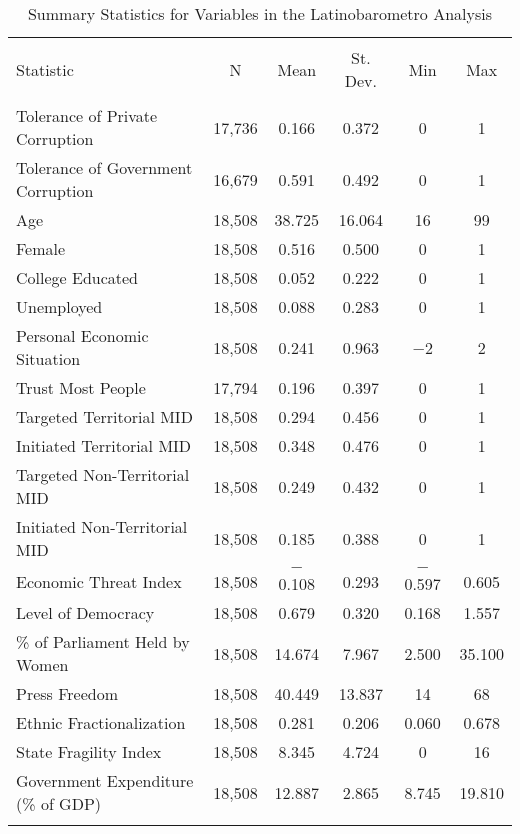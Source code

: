 \documentclass[11pt,]{article}
\begin{document}
\begin{table}[!htbp] \centering 
  \caption{Summary Statistics for Variables in the Latinobarometro Analysis} 
  \label{tab:summarylb} 
\begin{tabular}{@{\extracolsep{5pt}}lccccc} 
\\[-1.8ex]\hline 
\hline \\[-1.8ex] 
Statistic & \multicolumn{1}{c}{N} & \multicolumn{1}{c}{Mean} & \multicolumn{1}{c}{St. Dev.} & \multicolumn{1}{c}{Min} & \multicolumn{1}{c}{Max} \\ 
\hline \\[-1.8ex] 
Tolerance of Private Corruption & 17,736 & 0.166 & 0.372 & 0 & 1 \\ 
Tolerance of Government Corruption & 16,679 & 0.591 & 0.492 & 0 & 1 \\ 
Age & 18,508 & 38.725 & 16.064 & 16 & 99 \\ 
Female & 18,508 & 0.516 & 0.500 & 0 & 1 \\ 
College Educated & 18,508 & 0.052 & 0.222 & 0 & 1 \\ 
Unemployed & 18,508 & 0.088 & 0.283 & 0 & 1 \\ 
Personal Economic Situation & 18,508 & 0.241 & 0.963 & $-$2 & 2 \\ 
Trust Most People & 17,794 & 0.196 & 0.397 & 0 & 1 \\ 
Targeted Territorial MID & 18,508 & 0.294 & 0.456 & 0 & 1 \\ 
Initiated Territorial MID & 18,508 & 0.348 & 0.476 & 0 & 1 \\ 
Targeted Non-Territorial MID & 18,508 & 0.249 & 0.432 & 0 & 1 \\ 
Initiated Non-Territorial MID & 18,508 & 0.185 & 0.388 & 0 & 1 \\ 
Economic Threat Index & 18,508 & $-$0.108 & 0.293 & $-$0.597 & 0.605 \\ 
Level of Democracy & 18,508 & 0.679 & 0.320 & 0.168 & 1.557 \\ 
\% of Parliament Held by Women & 18,508 & 14.674 & 7.967 & 2.500 & 35.100 \\ 
Press Freedom & 18,508 & 40.449 & 13.837 & 14 & 68 \\ 
Ethnic Fractionalization & 18,508 & 0.281 & 0.206 & 0.060 & 0.678 \\ 
State Fragility Index & 18,508 & 8.345 & 4.724 & 0 & 16 \\ 
Government Expenditure (\% of GDP) & 18,508 & 12.887 & 2.865 & 8.745 & 19.810 \\ 
\hline \\[-1.8ex] 
\end{tabular} 
\end{table}
\end{document}
